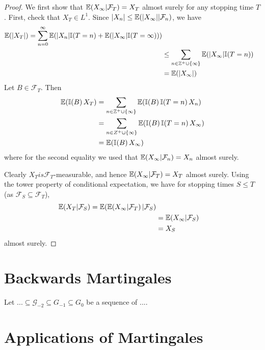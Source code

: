 \begin{proof}
  We first show that $\E{X_{\infty} | \mathcal{F}_{T}} = X_{T}$ almost
  surely for any stopping time $T$.  First, check that $X_{T} \in
  L^{1}$. Since $|X_{n}| \leq \E{|X_{\infty}| | \mathcal{F}_{n}}$, we
  have
  \begin{align}
    \label{eq:46}
    \E{|X_{T}|}= \sum_{n=0}^{\infty} \E{|X_{n}|\I{T=n} +
      \E{|X_{\infty}| \I{T = \infty}}} \\
    &\leq \sum_{n \in \Z^{+} \cup \{ \infty \}} \E{|X_{\infty}|
      \I{T=n}} \\
    &= \E{|X_{\infty}|}
  \end{align}  Let $B \in \mathcal{F}_{T}$. Then
  \begin{align}
    \label{eq:48}
    \E{\I{B} X_{T}} &= \sum_{n \in \Z^{+} \cup \{ \infty \}} \E{\I{B}
      \I{T=n} X_{n}} \\
    &= \sum_{n \in Z^{+} \cup \{ \infty \}} \E{\I{B} \I{T =n}
      X_{\infty}} \\
    &= \E{\I{B} X_{\infty}}
  \end{align} where for the second equality we used that
  $\E{X_{\infty} | \mathcal{F}_{n}} = X_{n}$ almost surely.

  Clearly $X_{T} is \mathcal{F}_{T}$-measurable, and hence
  $\E{X_{\infty} | \mathcal{F}_{T}} = X_{T}$ almost surely.  Using the
  tower property of conditional expectation, we have for stopping
  times $S \leq T$ (as $\mathcal{F}_{S} \subseteq \mathcal{F}_{T}$),
  \begin{align}
    \label{eq:49}
    \E{X_{T} | \mathcal{F}_{S}} = \E{\E{X_{\infty} | \mathcal{F}_{T}}
      | \mathcal{F}_{S}} \\
    &= \E{X_{\infty} | \mathcal{F}_{S}} \\
    &= X_{S}
  \end{align} almost surely.
\end{proof}

\section{Backwards Martingales}
\label{sec:backw-mart}

Let $... \subseteq \mathcal{G}_{-2} \subseteq G_{-1} \subseteq G_{0}$
be a sequence of $...$.

\section{Applications of Martingales}
\label{sec:appl-mart}

